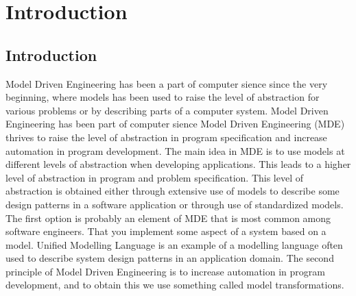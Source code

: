 \chapter{Introduction} %

\label{introduction} %


\section{Introduction}

Model Driven Engineering has been a part of computer sience since the very
beginning, where models has been used to raise the level of abstraction for
various problems or by describing parts of a computer system. Model Driven
Engineering has been part of computer sience Model Driven Engineering
(MDE)\cite{France2007} thrives to raise the level of abstraction in program
specification and increase automation in program development. The main idea in
MDE is to use models at different levels of abstraction when developing
applications. This leads to a higher level of abstraction in program and
problem specification. This level of abstraction is obtained either through
extensive use of models to describe some design patterns in a software
application or through use of standardized models. The first option is probably
an element of MDE that is most common among software engineers. That you
implement some aspect of a system based on a model.
Unified Modelling Language is an example of a modelling language often used to describe
system design patterns in an application domain. The second principle of Model
Driven Engineering is to increase automation in program development, and to
obtain this we use something called model transformations. 


